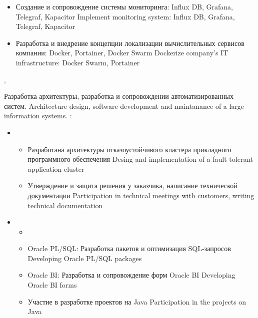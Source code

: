\documentclass[11pt,a4paper,sans]{moderncv}        %
\begin{document}
{\begin{itemize}
\begin{itemize}
				{Migration development environment from Bitbucket, TeamCity to GitLab, Jenkins}			
			\item {}
				{Создание и сопровождение системы мониторинга: Influx DB, Grafana, Telegraf, Kapacitor}
				{Implement monitoring system: Influx DB, Grafana, Telegraf, Kapacitor}
			\item {}
				{Разработка и внедрение концепции локализации вычислительных сервисов компании: Docker, Portainer, Docker Swarm}
				{Dockerize company's IT infrastructure: Docker Swarm, Portainer}
		\end{itemize}
	\end{itemize}
}


{\protect{}}
{\citymoscow, \country}
{}
{
	{Разработка архитектуры, разработка и сопровождении автоматизированных систем.}
	{Architecture design, software development and maintanance of a large information systems.}
  \newline{}
	\achievements:
	\begin{itemize}
	\item {}
		\begin{itemize}
		\item {}
			{Разработана архитектуры отказоустойчивого кластера прикладного программного обеспечения}
			{Desing and implementation of a fault-tolerant application cluster}
		\item {}
			{Утверждение и защита решения у заказчика, написание технической документации}
			{Participation in technical meetings with customers, writing technical documentation}
		\end{itemize}
	\item {}
		\begin{itemize}
			\item {}
			\item {}
				{Oracle PL/SQL: Разработка пакетов и оптимизация SQL-запросов}
				{Developing Oracle PL/SQL packages}
			\item {}
				{Oracle BI: Разработка и сопровождение форм Oracle BI}
				{Developing Oracle BI forms}
			\item {}
				{Участие в разработке проектов на Java}
				{Participation in the projects on Java}

\end{itemize}
\end{itemize}}
\end{document}
